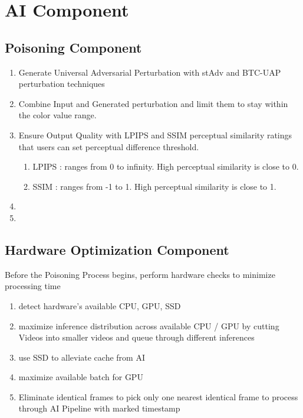 \section{AI Component}
\label{section:ai-component}

\subsection{Poisoning Component}
\label{subsection:poisoning-component}
\begin{enumerate}
    \item Generate Universal Adversarial Perturbation with stAdv and BTC-UAP perturbation techniques
    \item Combine Input and Generated perturbation and limit them to stay within the color value range.
    \item Ensure Output Quality with LPIPS and SSIM perceptual similarity ratings that users can set perceptual difference threshold.
    \begin{enumerate}
        \item LPIPS : ranges from 0 to infinity. High perceptual similarity is close to 0.
        \item SSIM : ranges from -1 to 1. High perceptual similarity is close to 1.
    \end{enumerate}
    \item 
    \item 
\end{enumerate}

\subsection{Hardware Optimization Component}
\label{subsection:hardware-optimization-component}
Before the Poisoning Process begins, perform hardware checks to minimize processing time
\begin{enumerate}
    \item detect hardware’s available CPU, GPU, SSD
    \item maximize inference distribution across available CPU / GPU by cutting Videos into smaller videos and queue through different inferences
    \item use SSD to alleviate cache from AI
    \item maximize available batch for GPU
    \item Eliminate identical frames to pick only one nearest identical frame to process through AI Pipeline with marked timestamp
\end{enumerate}
